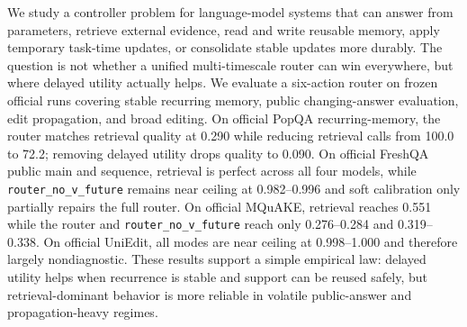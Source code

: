 We study a controller problem for language-model systems that can answer from parameters, retrieve external evidence, read and write reusable memory, apply temporary task-time updates, or consolidate stable updates more durably. The question is not whether a unified multi-timescale router can win everywhere, but where delayed utility actually helps. We evaluate a six-action router on frozen official runs covering stable recurring memory, public changing-answer evaluation, edit propagation, and broad editing. On official PopQA recurring-memory, the router matches retrieval quality at 0.290 while reducing retrieval calls from 100.0 to 72.2; removing delayed utility drops quality to 0.090. On official FreshQA public main and sequence, retrieval is perfect across all four models, while \texttt{router\_no\_v\_future} remains near ceiling at 0.982--0.996 and soft calibration only partially repairs the full router. On official MQuAKE, retrieval reaches 0.551 while the router and \texttt{router\_no\_v\_future} reach only 0.276--0.284 and 0.319--0.338. On official UniEdit, all modes are near ceiling at 0.998--1.000 and therefore largely nondiagnostic. These results support a simple empirical law: delayed utility helps when recurrence is stable and support can be reused safely, but retrieval-dominant behavior is more reliable in volatile public-answer and propagation-heavy regimes.

